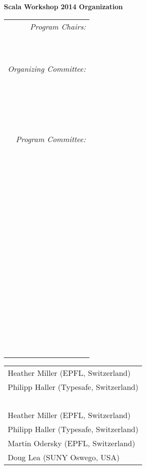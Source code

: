 \documentclass[10pt]{book}
\title{}
\date{}
\begin{document}
\thispagestyle{empty}


{\centering \LARGE \bf Scala Workshop 2014 Organization\par}

\vspace{0.5cm}

\begin{table}[ht]
\begin{minipage}[b]{0.35\linewidth}\centering
\begin{tabular}{r}
{\em Program Chairs:}\\
~\\
~\\
{\em Organizing Committee:}\\
~\\
~\\
~\\
~\\
{\em Program Committee:}\\
~\\
~\\
~\\
~\\
~\\
~\\
~\\
~\\
~\\
~\\
~\\
~\\
~\\
~\\
~\\
\end{tabular}
\end{minipage}
\hspace{0.5cm}
\begin{minipage}[b]{0.55\linewidth}
\centering
\begin{tabular}{l}
Heather Miller (EPFL, Switzerland)\\
Philipp Haller (Typesafe, Switzerland)\\
~\\
Heather Miller (EPFL, Switzerland)\\
Philipp Haller (Typesafe, Switzerland)\\
Martin Odersky (EPFL, Switzerland)\\
Doug Lea (SUNY Oswego, USA)\\

\end{tabular}
\end{minipage}
\end{table}
\end{document}
